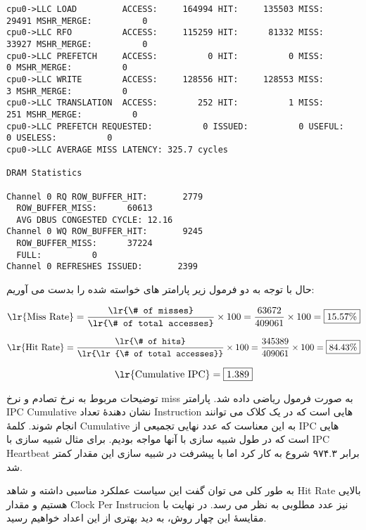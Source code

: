 \documentclass[17pt]{article}
\begin{document}
\begin{LTR}
\begin{lstlisting}[basicstyle=\tiny\ttfamily]
cpu0->LLC LOAD         ACCESS:     164994 HIT:     135503 MISS:      29491 MSHR_MERGE:          0
cpu0->LLC RFO          ACCESS:     115259 HIT:      81332 MISS:      33927 MSHR_MERGE:          0
cpu0->LLC PREFETCH     ACCESS:          0 HIT:          0 MISS:          0 MSHR_MERGE:          0
cpu0->LLC WRITE        ACCESS:     128556 HIT:     128553 MISS:          3 MSHR_MERGE:          0
cpu0->LLC TRANSLATION  ACCESS:        252 HIT:          1 MISS:        251 MSHR_MERGE:          0
cpu0->LLC PREFETCH REQUESTED:          0 ISSUED:          0 USEFUL:          0 USELESS:          0
cpu0->LLC AVERAGE MISS LATENCY: 325.7 cycles

DRAM Statistics

Channel 0 RQ ROW_BUFFER_HIT:       2779
  ROW_BUFFER_MISS:      60613
  AVG DBUS CONGESTED CYCLE: 12.16
Channel 0 WQ ROW_BUFFER_HIT:       9245
  ROW_BUFFER_MISS:      37224
  FULL:          0
Channel 0 REFRESHES ISSUED:       2399
\end{lstlisting}
\end{LTR}

حال با توجه به دو فرمول زیر پارامتر های خواسته شده را بدست می آوریم:


\begin{center}
\[
\text{\lr{Miss Rate}} = \frac{\text{\lr{\# of misses}}}{\text{\lr{\# of total accesses}}} \times 100 = \frac{63672}{409061} \times 100 = \boxed{15.57\%}
\]

\vspace{0.2cm} %

\[
\text{\lr{Hit Rate}} = \frac{\text{\lr{\# of hits}}}{\text{\lr{\lr{\# of total accesses}}}} \times 100 = \frac{345389}{409061} \times 100 = \boxed{84.43\%}
\]

\vspace{0.2cm} %

\[
\text{\lr{Cumulative IPC}} = \boxed{1.389}
\]
\end{center}

توضیحات مربوط به نرخ تصادم و نرخ miss به صورت فرمول ریاضی داده شد. پارامتر IPC Cumulative نشان دهندهٔ تعداد Instruction هایی است که در یک کلاک می توانند انجام شوند. 
کلمهٔ Cumulative به این معناست که عدد نهایی تجمیعی از IPC هایی است که در طول شبیه سازی با آنها مواجه بودیم. برای مثال شبیه سازی با IPC Heartbeat برابر ۹۷۴.۳ شروع به کار کرد اما با پیشرفت در شبیه سازی این مقدار کمتر شد.

به طور کلی می توان گفت این سیاست عملکرد مناسبی داشته و شاهد Hit Rate بالایی هستیم و مقدار Clock Per Instrucion نیز عدد مطلوبی به نظر می رسد. در نهایت با مقایسهٔ این چهار روش، به دید بهتری از این اعداد خواهیم رسید.
\end{document}
